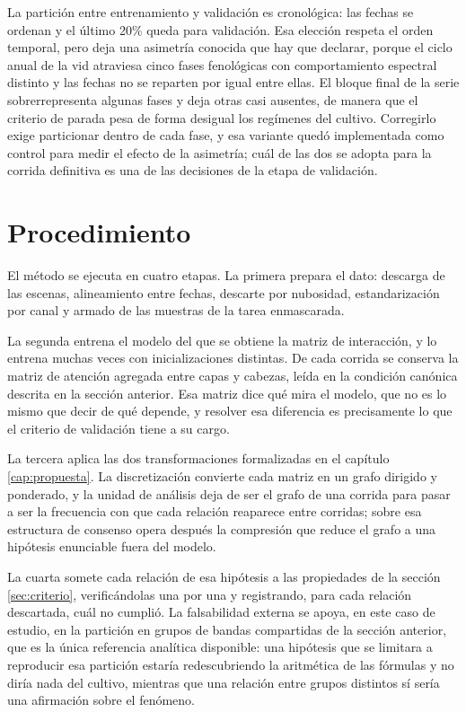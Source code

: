 La partición entre entrenamiento y validación es cronológica: las fechas se ordenan y el último 20\% queda para validación. Esa elección respeta el orden temporal, pero deja una asimetría conocida que hay que declarar, porque el ciclo anual de la vid atraviesa cinco fases fenológicas con comportamiento espectral distinto y las fechas no se reparten por igual entre ellas. El bloque final de la serie sobrerrepresenta algunas fases y deja otras casi ausentes, de manera que el criterio de parada pesa de forma desigual los regímenes del cultivo. Corregirlo exige particionar dentro de cada fase, y esa variante quedó implementada como control para medir el efecto de la asimetría; cuál de las dos se adopta para la corrida definitiva es una de las decisiones de la etapa de validación.

\section{Procedimiento}

El método se ejecuta en cuatro etapas. La primera prepara el dato: descarga de las escenas, alineamiento entre fechas, descarte por nubosidad, estandarización por canal y armado de las muestras de la tarea enmascarada.

La segunda entrena el modelo del que se obtiene la matriz de interacción, y lo entrena muchas veces con inicializaciones distintas. De cada corrida se conserva la matriz de atención agregada entre capas y cabezas, leída en la condición canónica descrita en la sección anterior. Esa matriz dice qué mira el modelo, que no es lo mismo que decir de qué depende, y resolver esa diferencia es precisamente lo que el criterio de validación tiene a su cargo.

La tercera aplica las dos transformaciones formalizadas en el capítulo \ref{cap:propuesta}. La discretización convierte cada matriz en un grafo dirigido y ponderado, y la unidad de análisis deja de ser el grafo de una corrida para pasar a ser la frecuencia con que cada relación reaparece entre corridas; sobre esa estructura de consenso opera después la compresión que reduce el grafo a una hipótesis enunciable fuera del modelo.

La cuarta somete cada relación de esa hipótesis a las propiedades de la sección \ref{sec:criterio}, verificándolas una por una y registrando, para cada relación descartada, cuál no cumplió. La falsabilidad externa se apoya, en este caso de estudio, en la partición en grupos de bandas compartidas de la sección anterior, que es la única referencia analítica disponible: una hipótesis que se limitara a reproducir esa partición estaría redescubriendo la aritmética de las fórmulas y no diría nada del cultivo, mientras que una relación entre grupos distintos sí sería una afirmación sobre el fenómeno.

